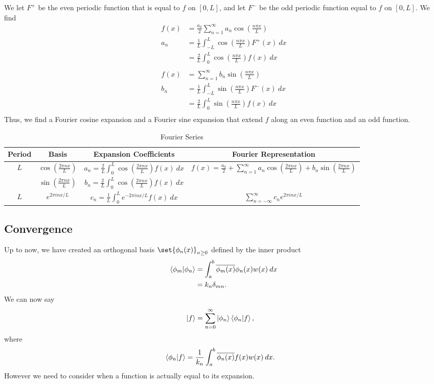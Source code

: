 \documentclass[10pt]{mypackage}
\begin{document}
We let $F^{+}$ be the even periodic function that is equal to $f$ on $[0,L]$, and let $F^{-}$ be the odd periodic function equal to $f$ on $[0,L]$. We find
\begin{align*}
  f(x) &= \frac{a_0}{2} \sum_{n=1}^{\infty}a_n\cos\left(\frac{n\pi x}{L}\right)\\
  a_n &= \frac{1}{L}\int_{-L}^{L} \cos\left(\frac{n\pi x}{L}\right)F^{+}(x)\:dx\\
  &= \frac{2}{L}\int_{0}^{L} \cos\left(\frac{n\pi x}{L}\right)f(x)\:dx\\
  \\
  f(x) &= \sum_{n=1}^{\infty}b_n\sin\left(\frac{n\pi x}{L}\right)\\
  b_n &= \frac{1}{L}\int_{-L}^{L} \sin\left(\frac{n\pi x}{L}\right)F^{-}(x)\:dx\\
  &= \frac{2}{L}\int_{0}^{L} \sin\left(\frac{n\pi x}{L}\right)f(x)\:dx\\
\end{align*}
Thus, we find a Fourier cosine expansion and a Fourier sine expansion that extend $f$ along an even function and an odd function.
\begin{table}
  \renewcommand{\arraystretch}{1.75}
  \begin{tabular}{c|c|c|c}
    Period & Basis & Expansion Coefficients & Fourier Representation\\
    \hline\hline
    \multirow[c]{2}{*}{$L$} & $\cos\left(\frac{2\pi n x}{L}\right)$ & $a_n = \frac{2}{L}\int_{0}^{L} \cos\left(\frac{2\pi n x}{L}\right)f(x)\:dx$ & \multirow[c]{2}{*}{$f(x) = \frac{a_0}{2} + \sum_{n=1}^{\infty}a_n\cos\left(\frac{2\pi n x}{L}\right) + b_n\sin\left(\frac{2\pi n x}{L}\right)$}\\
 & $\sin\left(\frac{2\pi n x}{L}\right)$ & $b_n = \frac{2}{L}\int_{0}^{L} \cos\left(\frac{2\pi n x}{L}\right)f(x)\:dx$ &\\
    $L$ & $\displaystyle e^{2\pi i n x / L}$ & $\displaystyle c_n = \frac{1}{L}\int_{0}^{L} e^{-2\pi i n x/L}f(x)\:dx$ & $\sum_{n=-\infty}^{\infty}c_ne^{2\pi i n x/L}$
  \end{tabular}
  \caption{Fourier Series}
\end{table}
\subsection{Convergence}%
Up to now, we have created an orthogonal basis $\set{\phi_n(x)}_{n\geq 0}$ defined by the inner product
\begin{align*}
  \braket{\phi_m}{\phi_n} &= \int_{a}^{b} \overline{\phi_m(x)}\phi_n(x)w(x)\:dx\\
                          &= k_{n}\delta_{mn}.
\end{align*}
We can now say
\begin{align*}
  \ket{f} &= \sum_{n=0}^{\infty}\ket{\phi_n} \braket{\phi_n}{f},
\end{align*}
where
\begin{align*}
  \braket{\phi_n}{f} &= \frac{1}{k_n} \int_{a}^{b} \overline{\phi_n(x)}f(x)w(x)\:dx.
\end{align*}
However we need to consider when a function is actually equal to its expansion.
\end{document}
